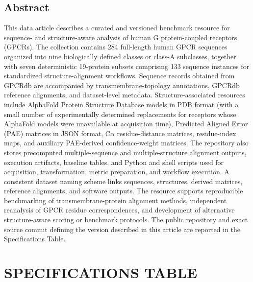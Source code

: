 \documentclass[a4paper,12pt]{article}
\begin{document}
	\subsection*{Abstract}
	This data article describes a curated and versioned benchmark resource for sequence- and structure-aware analysis of human G protein-coupled receptors (GPCRs). The collection contains 284 full-length human GPCR sequences organized into nine biologically defined classes or class-A subclasses, together with seven deterministic 19-protein subsets comprising 133 sequence instances for standardized structure-alignment workflows. Sequence records obtained from GPCRdb are accompanied by transmembrane-topology annotations, GPCRdb reference alignments, and dataset-level metadata. Structure-associated resources include AlphaFold Protein Structure Database models in PDB format (with a small number of experimentally determined replacements for receptors whose AlphaFold models were unavailable at acquisition time), Predicted Aligned Error (PAE) matrices in JSON format, C$\alpha$ residue-distance matrices, residue-index maps, and auxiliary PAE-derived confidence-weight matrices. The repository also stores precomputed multiple-sequence and multiple-structure alignment outputs, execution artifacts, baseline tables, and Python and shell scripts used for acquisition, transformation, metric preparation, and workflow execution. A consistent dataset naming scheme links sequences, structures, derived matrices, reference alignments, and software outputs. The resource supports reproducible benchmarking of transmembrane-protein alignment methods, independent reanalysis of GPCR residue correspondences, and development of alternative structure-aware scoring or benchmark protocols. The public repository and exact source commit defining the version described in this article are reported in the Specifications Table.
	
	\section*{SPECIFICATIONS TABLE}
	
\end{document}
